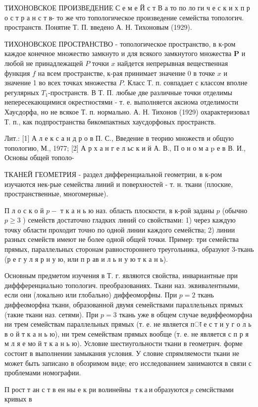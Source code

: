 \documentclass[10pt]{article}
\begin{document}
ТИХОНОВСКОЕ ПРОИЗВЕДЕНИЕ С е м е Й с т В а то по ло ги ч е с к и х п р о с т р а н с т в- то же что топологическое произведение семейства топологич. пространств. Понятие Т. П. введено А. Н. Тихоновым (1929).



ТИХОНОВСКОЕ ПРОСТРАНСТВО - топологическое пространство, в к-ром каждое конечное множество замкнуто и для всякого замкнутого множества $\boldsymbol{P}$ и любой не принадлежащей $P$ точки $x$ найдется непрерывная вещественная функция $f$ на всем пространстве, к-рая принимает значение 0 в точке $x$ и значение 1 во всех точках множества $P$. Класс Т. п. совпадает с классом вполне регулярных $T_{1}$-пространств. В Т. П. любые две различные точки отделимы непересекающимися окрестностями - т. е. выполняется аксиома отделимости Хаусдорфа, но не всякое Т. п. нормально. А. Н. Тихонов (1929) охарактеризовал Т. п., как подпространства бикомпактных хаусдорфовых пространств.



Лит.: [1] А л е к с а н д р о в П. С., Введение в теорию множеств и общую топологию, М., 1977; [2] А р х а н г е л ьс к и й А. В., П о н о м а p е в В. И., Основы общей тополо-



ТКАНЕЙ ГЕОМЕТРИЯ - раздел дифференциальной геометрии, в к-ром изучаются нек-рые семейства линий и поверхностей - т. н. ткани (плоские, пространственные, многомерные).



П л о с к о й $p-$ т к а н ь ю наз. область плоскости, в к-рой заданы $p$ (обычно $p \geqslant 3$ ) семейств достаточно гладких линий со свойствами: 1) через каждую точку области проходит точно по одной линии каждого семейства; 2) линии разных семейств имеют не более одной общей точки. Пример: три семейства прямых, параллельных сторонам равностороннего треугольника, образуют 3-ткань (р е г у л я р н у ю, или п р ав и л ь н у ю т к а н ь).



Основным предметом изучения в Т. г. являются свойства, инвариантные при диффференциально топологич. преобразованиях. Ткани наз. эквивалентными, если они (локально или глобально) диффеоморфны. При $p=2$ ткань диффеоморфна ткани, образованной двумя семействами параллельных прямых (такие ткани наз. сетями). При $p=3$ ткань уже в общем случае ведиффеоморфна ни трем семействам параллельных прямых (т. е. не является пा е с т и у г о л ь в о й т к а н ь ю), ни трем семействам прямых вообще (т. е. не является с п р я м л я е мо й т к а н ь ю). Условие шестиугольности ткани в геометрич. форме состоит в выполнении замыкания условия. У словие спрямляемости ткани не может быть записано в обозримом виде; его исследованием занимаются в связи с проблемами номографии.



П рост т ан с т в ен ны е к ри волинейны $\mathbf{~ т ~ к ~ а ~ и ~ о б р а з у ю т с я ~} p$ семсйствами кривых в
\end{document}
